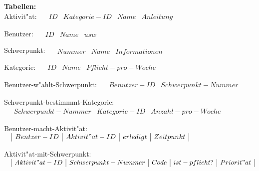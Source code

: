 \documentclass{article}
\begin{document}
\\ \\
\textbf{Tabellen:}\\

Aktivit"at:		
$\quad \begin{array}{|c|c|c|c|c|}                                           
ID & Kategorie-ID & Name & Anleitung
\end{array}$

Benutzer:	
$\quad \begin{array}{|c|c|c|c|c|}                                           
ID & Name & usw
\end{array}$

Schwerpunkt:	
$\quad \begin{array}{|c|c|c|c|c|}                                           
Nummer & Name & Informationen
\end{array}$

Kategorie:	
$\quad \begin{array}{|c|c|c|c|c|}                                           
ID & Name & Pflicht-pro-Woche
\end{array}$

Benutzer-w"ahlt-Schwerpunkt:	
$\quad \begin{array}{|c|c|c|c|c|}                                           
Benutzer-ID & Schwerpunkt-Nummer
\end{array}$

Schwerpunkt-bestimmmt-Kategorie:	
$\quad \begin{array}{|c|c|c|c|c|}                                           
Schwerpunkt-Nummer & Kategorie-ID & Anzahl-pro-Woche
\end{array}$

Benutzer-macht-Aktivit"at:	
$\quad \begin{array}{|c|c|c|c|c|}                                           
Bentzer-ID & Aktivit"at-ID & erledigt & Zeitpunkt
\end{array}$

Aktivit"at-mit-Schwerpunkt:	
$\quad \begin{array}{|c|c|c|c|c|}                                           
Aktivit"at-ID & Schwerpunkt-Nummer & Code & ist-pflicht? & Priorit"at
\end{array}$
\end{document}
